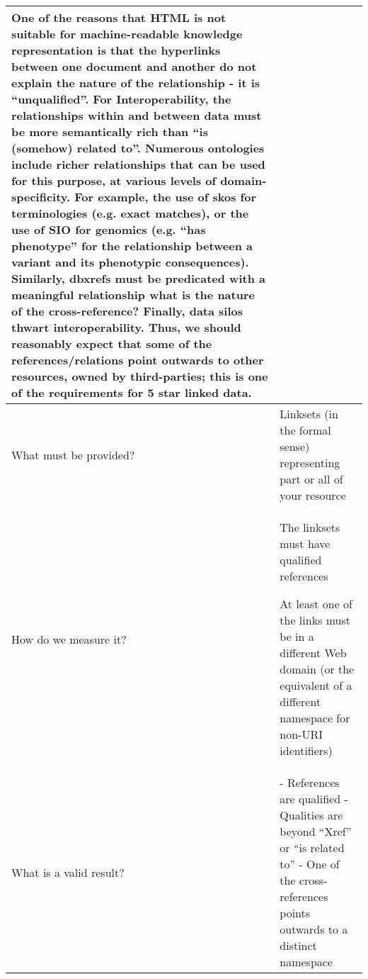 \documentclass[english]{article}
\begin{document}
\begin{longtable}{|p{5cm}|p{9cm}|}
One of the reasons that HTML is not suitable for machine-readable knowledge representation is that the hyperlinks between one document and another do not explain the nature of the relationship - it is “unqualified”.  For Interoperability, the relationships within and between data must be more semantically rich than “is (somehow) related to”.\newline 
\newline 
Numerous ontologies include richer relationships that can be used for this purpose, at various levels of domain-specificity.  For example, the use of skos for terminologies (e.g. exact matches), or the use of SIO for genomics (e.g. “has phenotype” for the relationship between a variant and its phenotypic consequences).\newline 
\newline 
Similarly, dbxrefs must be predicated with a meaningful relationship  what is the nature of the cross-reference?\newline 
\newline 
Finally, data silos thwart interoperability.  Thus, we should reasonably expect that some of the references/relations point outwards to other resources, owned by third-parties; this is one of the requirements for 5 star linked data. \newline 

  
\\



\hline
What must be provided? &  


Linksets (in the formal sense) representing part or all of your resource



\\



\hline
How do we measure it? &  


The linksets must have qualified references

At least one of the links must be in a different Web domain (or the equivalent of a different namespace for non-URI identifiers)



\\



\hline
What is a valid result? &  


- References are qualified\newline
- Qualities are beyond “Xref” or “is related to”\newline
- One of the cross-references points outwards to a distinct namespace\newline



\end{longtable}
\end{document}
